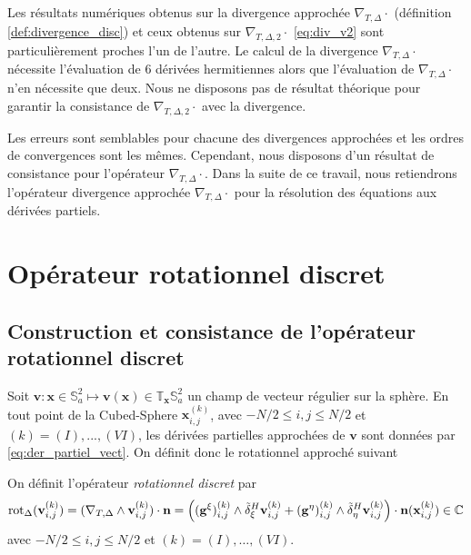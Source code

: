 Les résultats numériques obtenus sur la divergence approchée $\nabla_{T,\Delta} \cdot$ (définition \ref{def:divergence_disc}) et ceux obtenus sur $\nabla_{T,\Delta,2} \cdot$ \eqref{eq:div_v2} sont particulièrement proches l'un de l'autre. Le calcul de la divergence $\nabla_{T,\Delta} \cdot$ nécessite l'évaluation de 6 dérivées hermitiennes alors que l'évaluation de $\nabla_{T,\Delta} \cdot$ n'en nécessite que deux. Nous ne disposons pas de résultat théorique pour garantir la consistance de $\nabla_{T,\Delta,2} \cdot$ avec la divergence.

Les erreurs sont semblables pour chacune des divergences approchées et les ordres de convergences sont les mêmes. Cependant, nous disposons d'un résultat de consistance pour l'opérateur $\nabla_{T,\Delta} \cdot$. Dans la suite de ce travail, nous retiendrons l'opérateur divergence approchée $\nabla_{T,\Delta} \cdot$ pour la résolution des équations aux dérivées partiels.























\section{Opérateur rotationnel discret}

\subsection{Construction et consistance de l'opérateur rotationnel discret}


Soit $\mathbf{v} : \mathbf{x} \in \mathbb{S}_a^2 \mapsto \mathbf{v}(\mathbf{x}) \in \mathbb{T}_{\mathbf{x}} \mathbb{S}_a^2$ un champ de vecteur régulier sur la sphère. En tout point de la Cubed-Sphere $\mathbf{x}_{i,j}^{(k)}$, avec $-N/2 \leq i,j \leq N/2$ et $(k) = (I), ..., (VI)$, les dérivées partielles approchées de $\mathbf{v}$ sont données par \eqref{eq:der_partiel_vect}. On définit donc le rotationnel approché suivant

\begin{definition}
On définit l'opérateur \textit{rotationnel discret} par 
\begin{equation}
\text{rot}_{\Delta} (\mathbf{v}_{i,j}^{(k)}) = (\nabla_{T,\Delta} \wedge \mathbf{v}_{i,j}^{(k)}) \cdot \mathbf{n} = \left( ( \mathbf{g}^{\xi} )_{i,j}^{(k)} \wedge \tilde{\delta}^H_{\xi} \mathbf{v}_{i,j}^{(k)}   + ( \mathbf{g}^{\eta} )_{i,j}^{(k)} \wedge \tilde{\delta}^H_{\eta} \mathbf{v}_{i,j}^{(k)} \right) \cdot \mathbf{n}(\mathbf{x}_{i,j}^{(k)}) \in \mathbb{C}
\end{equation}
avec $-N/2 \leq i,j \leq N/2$ et $(k) = (I), \ldots , (VI)$.
\label{def:rotationnel_disc}
\end{definition}

